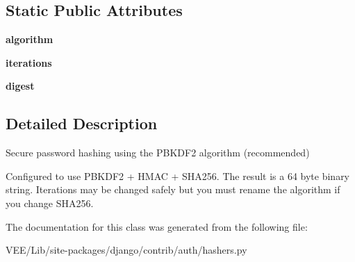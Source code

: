 \subsection*{Static Public Attributes}
\begin{DoxyCompactItemize}
\item 
\mbox{\label{classdjango_1_1contrib_1_1auth_1_1hashers_1_1_p_b_k_d_f2_password_hasher_ae056e303d49eae0d9c832b7404c9a0b9}} 
{\bfseries algorithm}
\item 
\mbox{\label{classdjango_1_1contrib_1_1auth_1_1hashers_1_1_p_b_k_d_f2_password_hasher_a934301d1a2548745998ee8e58cc3fd27}} 
{\bfseries iterations}
\item 
\mbox{\label{classdjango_1_1contrib_1_1auth_1_1hashers_1_1_p_b_k_d_f2_password_hasher_a933f8b374d416f5a1e012aa5c74d951f}} 
{\bfseries digest}
\end{DoxyCompactItemize}


\subsection{Detailed Description}
\begin{DoxyVerb}Secure password hashing using the PBKDF2 algorithm (recommended)

Configured to use PBKDF2 + HMAC + SHA256.
The result is a 64 byte binary string.  Iterations may be changed
safely but you must rename the algorithm if you change SHA256.
\end{DoxyVerb}
 

The documentation for this class was generated from the following file\+:\begin{DoxyCompactItemize}
\item 
V\+E\+E/\+Lib/site-\/packages/django/contrib/auth/hashers.\+py\end{DoxyCompactItemize}
